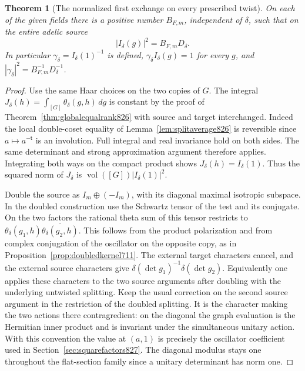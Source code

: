 \documentclass[a4paper,11pt]{article}
\newtheorem{theorem}[proposition]{Theorem}
\theoremstyle{definition}
\theoremstyle{remark}
\numberwithin{equation}{section}
\begin{document}
\begin{theorem}[The normalized first exchange on every prescribed twist]
\leavevmode\label{thm:normalfirst828}
On each of the given fields there is a positive number \(B_{F,m}\),
independent of \(\delta\), such that on the entire adelic source
\[
             |I_\delta(g)|^2=B_{F,m}D_\delta .
\]
In particular \(\gamma_\delta=I_\delta(1)^{-1}\) is defined,
\(\gamma_\delta I_\delta(g)=1\) for every \(g\), and
\(|\gamma_\delta|^2=B_{F,m}^{-1}D_\delta^{-1}\).
\end{theorem}
\begin{proof}
Use the same Haar choices on the two copies of \(G\).
The integral \(J_\delta(h)=\int_{[G]}\theta_\delta(g,h)\,dg\)
is constant by the proof of Theorem~\ref{thm:globalequalrank826}
with source and target interchanged. Indeed the local
double-coset equality of Lemma~\ref{lem:splitaverage826}
is reversible since \(a\mapsto a^{-\mathsf t}\) is an
involution. Full integral and real invariance hold on both
sides. The same determinant and strong approximation argument
therefore applies. Integrating both ways on the compact
product shows \(J_\delta(h)=I_\delta(1)\). Thus the squared
norm of \(J_\delta\) is \(\operatorname{vol}([G])|I_\delta(1)|^2\).

Double the source as \(I_m\oplus(-I_m)\), with its diagonal
maximal isotropic subspace. In the doubled construction use
the Schwartz tensor of the test and its conjugate. On the
two factors the rational theta sum of this tensor restricts
to \(\theta_\delta(g_1,h)\overline{\theta_\delta(g_2,h)}\).
This follows from the product polarization and from
complex conjugation of the oscillator on the opposite
copy, as in Proposition~\ref{prop:doubledkernel711}. The
external target characters cancel, and the external source
characters give \(\delta(\det g_1)^{-1}\delta(\det g_2)\).
Equivalently one applies these characters to the two source
arguments after doubling with the underlying untwisted
splitting. Keep the usual correction on the second source
argument in the restriction of the doubled splitting. It is
the character making the two actions there contragredient:
on the diagonal the graph evaluation is the Hermitian inner
product and is invariant under the simultaneous unitary action.
With this convention the value at \((a,1)\) is precisely the
oscillator coefficient used in Section~\ref{sec:squarefactors827}.
The diagonal modulus stays one throughout the flat-section
family since a unitary determinant has norm one.


\end{proof}
\end{document}
